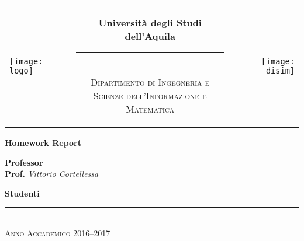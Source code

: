 \begin{titlepage}
\begin{center}
\normalsize

\begin{center}

\begin{tabular}[t]{@{} l @{} c @{} r @{}}
\parbox[c]{0.15\textwidth}{\raggedright \texttt{[image: logo]}}
&
\parbox[c]{0.7\textwidth}
{
\centering \bfseries
Università degli Studi dell'Aquila \\[-5pt]
\rule{0.6\textwidth}{1pt} \\
{\centering \scshape \small Dipartimento di Ingegneria e \\Scienze dell'Informazione e Matematica} \\
}
&
\parbox[c]{0.15\textwidth}{\raggedleft \texttt{[image: disim]}}
\end{tabular}
\end{center}

\bigskip \bigskip



\bigskip
\bigskip
\bigskip

\vfil

{\bfseries \huge
Homework Report \\
}

{\large
\bigskip
\bigskip
\bigskip
\bigskip
{\bfseries \large Professor \\ }
\bigskip
\textbf{Prof.} \textit{Vittorio Cortellessa} \\
}

{\bfseries \large
\bigskip
\bigskip
\bigskip
\bigskip
Studenti \\
}

\vfil
\vfil


\vspace{2\baselineskip}


\vfil \vfil \vfil

\rule{\textwidth}{1pt}\\
{\scshape Anno Accademico 2016--2017}

\end{center}
\end{titlepage}